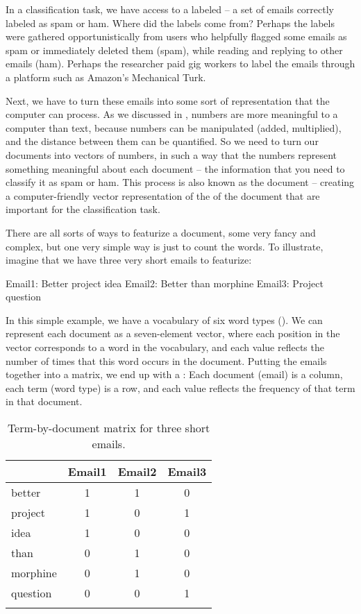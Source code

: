 In a classification task, we have access to a labeled   -- a set of emails correctly labeled as  spam or ham.  Where did the labels come from?  Perhaps the labels were gathered opportunistically from users who helpfully flagged some emails as spam or immediately deleted them (spam), while reading and replying to other emails (ham).  Perhaps the researcher paid  gig workers to label the emails through a platform such as Amazon's Mechanical Turk.  

Next, we have to turn these emails into some sort of representation that the computer can process.  As we discussed in , numbers are more meaningful to a computer than text, because numbers can be manipulated (added, multiplied), and the distance between them can be quantified.  So we need to turn our documents into vectors of numbers, in such a way that the numbers represent something meaningful about each document -- the information that you need to classify it as spam or ham.  This process is also known as  the document -- creating a computer-friendly vector representation of the  of the document that are important for the classification task.

There are all sorts of ways to featurize a document, some very fancy and complex, but one very simple way is just to count the words. To illustrate, imagine that we have three very short emails to featurize:

\ea \ea Email1: Better project idea
    \ex Email2: Better than morphine
    \ex Email3: Project question
\z 
\z 

In this simple example, we have a vocabulary of six word types (). We can represent each document as a seven-element vector, where each position in the vector corresponds to a word in the vocabulary, and each value reflects the number of times that this word occurs in the document.  Putting the emails together into a matrix, we end up with a : Each document (email) is a column,  each term (word type) is a row, and each value reflects the frequency of that term in that document.


\begin{table}
\begin{tabular}{lccc}
\lsptoprule
       & Email1 & Email2  & Email3 \\ \midrule
better & 1 & 1 & 0 \\
project & 1 & 0 & 1 \\
idea & 1 & 0 & 0 \\
than & 0 & 1 & 0 \\
morphine & 0 & 1 & 0 \\
question & 0 & 0 & 1 \\
\lspbottomrule
\end{tabular}
\caption{Term-by-document matrix for three short emails.}
\label{fig:term-by-email}
\end{table}


